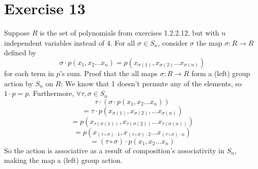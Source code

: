 \documentclass[12pt]{article}
\begin{document}
    \section*{Exercise 13}
    Suppose $R$ is the set of polynomials from exercises 1.2.2.12,
    but with $n$ independent variables instead of 4.
    For all $\sigma \in S_n$,
    consider $\sigma$ the map $\sigma: R \to R$ defined by \\
    \[\sigma \cdot p(x_1, x_2 \dots x_n)
    = p(x_{\sigma(1)}, x_{\sigma(2)} \dots x_{\sigma(n)})\]
    for each term in $p$'s sum.
    Proof that the all maps $\sigma: R \to R$
    form a (left) group action by $S_n$ on $R$:
    We know that 1 doesn't permute any of the elements,
    so $1 \cdot p = p$.
    Furthermore, $\forall \tau, \sigma \in S_n$
    \[\tau \cdot (\sigma \cdot p(x_1, x_2 \dots x_n)) \]
    \[ = \tau \cdot p(x_{\sigma(1)}, x_{\sigma(2)}, \dots x_{\sigma(n)}) \]
    \[= p(x_{\tau(\sigma(1))}, x_{\tau(\sigma(2))}
    \dots x_{\tau(\sigma(n))}) \]
    \[ = p(x_{(\tau \circ \sigma) \cdot 1},
    x_{(\tau \circ \sigma) \cdot 2}
    \dots x_{(\tau \circ \sigma) \cdot n}) \]
    \[= (\tau \circ \sigma) \cdot p(x_1, x_2 \dots x_n) \]
    So the action is associative as a result of composition's
    associativity in $S_n$,
    making the map a (left) group action.
\end{document}
